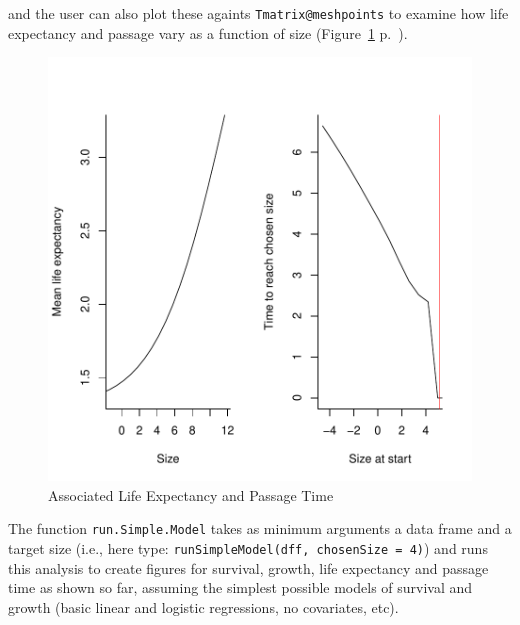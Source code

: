 \documentclass{article}
\begin{document}
\begin{Schunk}
\end{Schunk}
and the user can also plot these againts {\tt Tmatrix@meshpoints} to examine how life expectancy and passage vary as a function of size (Figure~\ref{fig:three} p.~\pageref{fig:three}).
\begin{figure}
\begin{center}
\includegraphics{IPMpack_Vignette-fig3}
\end{center}
\caption{Associated Life Expectancy and Passage Time}
\label{fig:three}
\end{figure}
The function {\tt run.Simple.Model} takes as minimum arguments a data frame and a target size (i.e., here type: {\tt runSimpleModel(dff, chosenSize = 4)}) and runs this analysis to create figures for survival, growth, life expectancy and passage time as shown so far, assuming the simplest possible models of survival and growth (basic linear and logistic regressions, no covariates, etc).
\end{document}
